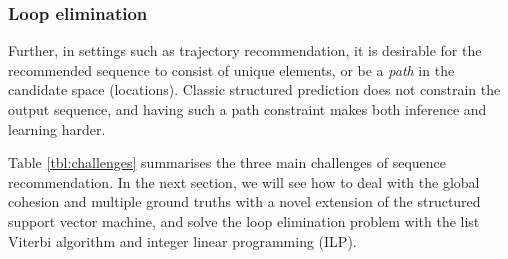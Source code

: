 \subsubsection{Loop elimination}
Further, in settings such as trajectory recommendation, it is desirable for the recommended sequence to consist of unique elements,
or be a {\em path} in the candidate space (\eg locations).
Classic structured prediction does not constrain the output sequence, and having such a
path constraint makes both inference and learning harder.


Table \ref{tbl:challenges} summarises the three main challenges of sequence recommendation.
In the next section, we will see how to deal with the global cohesion and multiple ground truths with a novel extension of
the structured support vector machine,
and solve the loop elimination problem with the list Viterbi algorithm and integer linear programming (ILP).
